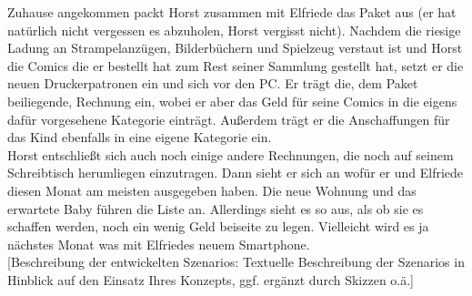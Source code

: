 Zuhause angekommen packt Horst zusammen mit Elfriede das Paket aus (er hat
nat\"urlich nicht vergessen es abzuholen, Horst vergisst nicht). Nachdem die
riesige Ladung an Strampelanz\"ugen, Bilderb\"uchern und Spielzeug verstaut
ist und Horst die Comics die er bestellt hat zum Rest seiner Sammlung
gestellt hat, setzt er die neuen Druckerpatronen ein und sich vor den PC.
Er tr\"agt die, dem Paket beiliegende, Rechnung ein, wobei er aber das Geld
für seine Comics in die eigens daf\"ur vorgesehene Kategorie eintr\"agt.
Au\ss erdem tr\"agt er die Anschaffungen für das Kind ebenfalls in eine eigene
Kategorie ein.\\

Horst entschlie\ss t sich auch noch einige andere Rechnungen, die noch auf
seinem Schreibtisch herumliegen einzutragen. Dann sieht er sich an wof\"ur er
und Elfriede diesen Monat am meisten ausgegeben haben. Die neue Wohnung und
das erwartete Baby f\"uhren die Liste an. Allerdings sieht es so aus, als ob
sie es schaffen werden, noch ein wenig Geld beiseite zu legen. Vielleicht
wird es ja n\"achstes Monat was mit Elfriedes neuem Smartphone.\\

[Beschreibung der entwickelten Szenarios: Textuelle Beschreibung der Szenarios in Hinblick auf den Einsatz Ihres Konzepts, ggf. ergänzt durch Skizzen o.ä.]
